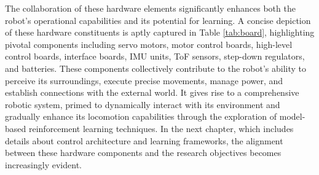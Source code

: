 The collaboration of these hardware elements significantly enhances both the robot's operational capabilities and its potential for learning. A concise depiction of these hardware constituents is aptly captured in Table \ref{tab:board}, highlighting pivotal components including servo motors, motor control boards, high-level control boards, interface boards, \ac{IMU} units, \ac{ToF} sensors, step-down regulators, and batteries. These components collectively contribute to the robot's ability to perceive its surroundings, execute precise movements, manage power, and establish connections with the external world. It gives rise to a comprehensive robotic system, primed to dynamically interact with its environment and gradually enhance its locomotion capabilities through the exploration of model-based reinforcement learning techniques. In the next chapter, which includes details about control architecture and learning frameworks, the alignment between these hardware components and the research objectives becomes increasingly evident.
